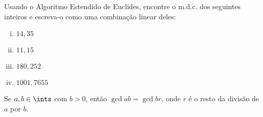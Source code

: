 \begin{exercise}
	Usando o Algoritmo Estendido de Euclides, encontre o m.d.c. dos seguintes inteiros e escreva-o como uma combinação linear deles:
	\begin{enumerate}[(i)]
		\item $14, 35$
		\item $11, 15$
		\item $180, 252$
		\item $1001, 7655$
	\end{enumerate}
\end{exercise}

\begin{exercise}
	Se $a, b \in \ints$ com $b > 0$, então $\gcd a b = \gcd b r$, onde $r$ é o resto da divisão de $a$ por $b$.
\end{exercise}
